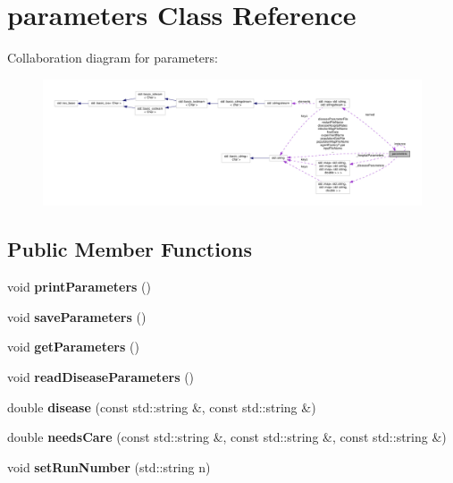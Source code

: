 \hypertarget{classparameters}{}\section{parameters Class Reference}
\label{classparameters}


Collaboration diagram for parameters\+:\nopagebreak
\begin{figure}[H]
\begin{center}
\leavevmode
\includegraphics[width=350pt]{classparameters__coll__graph}
\end{center}
\end{figure}
\subsection*{Public Member Functions}
\begin{DoxyCompactItemize}
\item 
\mbox{\label{classparameters_a5afb6f0a6eeec826d39795add97c2891}} 
void {\bfseries print\+Parameters} ()
\item 
\mbox{\label{classparameters_a1f9a3b98c893d21631f9611202ba4ad6}} 
void {\bfseries save\+Parameters} ()
\item 
\mbox{\label{classparameters_a62f7b648c3c5c5b71894cdb9825ec5ed}} 
void {\bfseries get\+Parameters} ()
\item 
\mbox{\label{classparameters_a3c25eaa213291dce9de11ace386770a5}} 
void {\bfseries read\+Disease\+Parameters} ()
\item 
\mbox{\label{classparameters_a29ec80156af04d3729397f122717e4df}} 
double {\bfseries disease} (const std\+::string \&, const std\+::string \&)
\item 
\mbox{\label{classparameters_a44a495028fba207fe2de8b2a4d3cae61}} 
double {\bfseries needs\+Care} (const std\+::string \&, const std\+::string \&, const std\+::string \&)
\item 
\mbox{\label{classparameters_ac12f6a6ab14a6f5ce5f48e4c535f3e03}} 
void {\bfseries set\+Run\+Number} (std\+::string n)
\end{DoxyCompactItemize}
